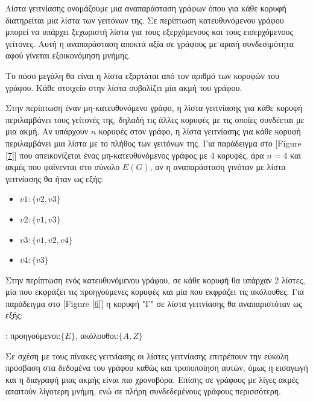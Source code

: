 Λίστα γειτνίασης ονομάζουμε μια αναπαράσταση γράφων όπου για κάθε κορυφή διατηρείται μια λίστα των γειτόνων της. Σε περίπτωση κατευθυνόμενου γράφου μπορεί να υπάρχει ξεχωριστή λίστα για τους εξερχόμενους και τους εισερχόμενους γείτονες. Αυτή η αναπαράσταση αποκτά αξία σε γράφους με αραιή συνδεσιμότητα αφού γίνεται εξοικονόμηση μνήμης. 

Το πόσο μεγάλη θα είναι η λίστα εξαρτάται από τον αριθμό των κορυφών του γράφου. Κάθε στοιχείο στην λίστα συβολίζει μία ακμή του γράφου.
 
 Στην περίπτωση έναν μη-κατευθυνόμενο γράφο, η λίστα γειτνίασης για κάθε κορυφή περιλαμβάνει τους γείτονές της, δηλαδή τις άλλες κορυφές με τις οποίες συνδέεται με μια ακμή. Αν υπάρχουν $n$ κορυφές στον γράφο, η λίστα γειτνίασης για κάθε κορυφή περιλαμβάνει μια λίστα με το πλήθος των γειτόνων της. Για παράδειγμα στο [Figure \ref{7}] που απεικονίζεται ένας μη-κατευθυνόμενος γράφος με 4 κορυφές, άρα $n=4$ και ακμές που φαίνενται στο σύνολο $E(G)$, αν η αναπαράσταση γινόταν με λίστα γειτνίασης θα ήταν ως εξής: 
\begin{itemize}
    \item $v1: \{v2, v3\}$
    \item $v2: \{v1, v3\}$
    \item $v3: \{v1, v2, v4\}$
    \item $v4: \{v3\}$
\end{itemize}

Στην περίπτωση ενός κατευθυνόμενου γράφου, σε κάθε κορυφή θα υπάρχαν 2 λίστες, μία που εκφράζει τις προηγούμενες κορυφές και μία που εκφράζει τις ακόλουθες. Για παράδειγμα στο [Figure \ref{6}] η κορυφή "Γ" σε λίστα γειτνίασης θα αναπαριστόταν ως εξής: 

\quad{}: προηγούμενοι:$\{E\}$, ακόλουθοι:$\{A, Z\}$


Σε σχέση με τους πίνακες γειτνίασης οι λίστες γειτνίασης επιτρέπουν την εύκολη πρόσβαση στα δεδομένα του γράφου καθώς και τροποποίηση αυτών, όμως η εισαγωγή και η διαγραφή μιας ακμής είναι πιο χρονοβόρα. Επίσης σε γράφους με λίγες ακμές απαιτούν λίγοτερη μνήμη, ενώ σε πλήρη συνδεδεμένους γράφους περισσότερη. 
